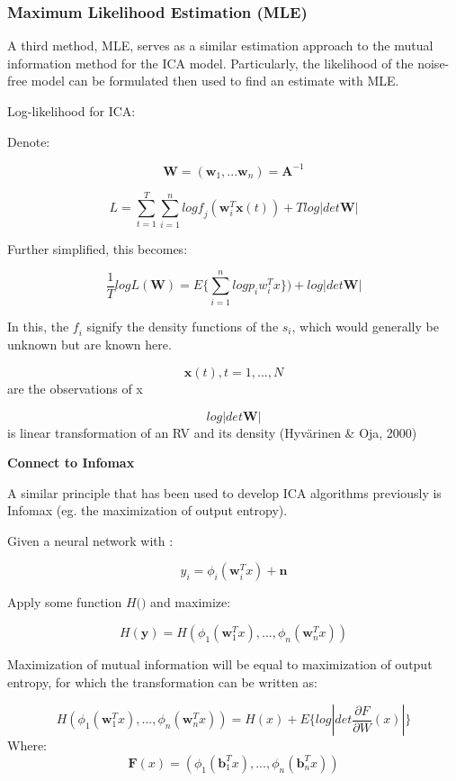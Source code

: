 \documentclass[12pt,twoside]{amherstthesis}
\begin{document}
  \subsubsection{Maximum Likelihood Estimation
  (MLE)}\label{maximum-likelihood-estimation-mle}
  
  A third method, MLE, serves as a similar estimation approach to the
  mutual information method for the ICA model. Particularly, the
  likelihood of the noise-free model can be formulated then used to find
  an estimate with MLE.
  
  Log-likelihood for ICA:
  
  Denote:
  
  \[ \textbf{W} = (\textbf{w}_1,...\textbf{w}_n) = \textbf{A}^{-1} \]
  
  \[ L = \sum_{t=1}^T \sum_{i=1}^n log \textit{f}_j(\textbf{w}_\textit{i}^T  \textbf{x}(t))+\textit{T}log|det\textbf{W}|\]
  
  Further simplified, this becomes:
  
  \[ \frac{1}{T} log L(\textbf{W}) = E\{\sum_{i=1}^n log p_i w_i^Tx\}) + log|det \textbf{W}|\]
  
  In this, the \(\textit{f}_i\) signify the density functions of the
  \(s_i\), which would generally be unknown but are known here.
  
  \[ \textbf{x}(t), t= 1,...,N\] are the observations of x
  
  \[ log|det\textbf{W}|\] is linear transformation of an RV and its
  density (Hyvärinen \& Oja, 2000) \newline
  
  \textbf{Connect to Infomax}
  
  A similar principle that has been used to develop ICA algorithms
  previously is Infomax (eg. the maximization of output entropy).
  
  Given a neural network with :
  
  \[ \textit{y}_i = \phi_i(\textbf{w}_i^Tx)+\textbf{n}\]
  
  Apply some function \(\textit{H()}\) and maximize:
  
  \[\textit{H}(\textbf{y}) = \textit{H}(\phi_1(\textbf{w}_1^Tx),...,\phi_n(\textbf{w}_n^Tx))\]
  \newline
  
  Maximization of mutual information will be equal to maximization of
  output entropy, for which the transformation can be written as:
  
  \[\textit{H}(\phi_1(\textbf{w}_1^Tx),...,\phi_n(\textbf{w}_n^Tx)) =\textit{H}(x)+\textit{E}\{log | det \frac{\partial F}{\partial W}(x)|\}\]
  Where:
  \[\textbf{F}(x) = (\phi_1(\textbf{b}_1^Tx),...,\phi_n(\textbf{b}_n^Tx))\]
  
\end{document}
